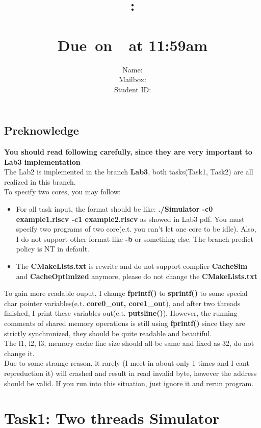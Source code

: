 \mathbb{R} \documentclass{article}
\title{
    \vspace{2in}
    \textmd{\textbf{\hmwkClass:\\  \hmwkTitle}}\\
    \normalsize\vspace{0.1in}\small{Due\ on\ \hmwkDueDate\ at 11:59am}\\
   \vspace{2in}
}
\author{
	Name: \textbf{\hmwkAuthorName} \\
    Mailbox: \textbf{\hmwkAuthorMail} \\
	Student ID: \hmwkAuthorID}
\date{}
\begin{document}
\maketitle
\pagebreak
\tableofcontents

\pagebreak


\subsection{Preknowledge}
\textcolor[rgb]{1,0,0}{\textbf{You should read following carefully, since they are very important to Lab3 implementation}}\\
The Lab2 is implemented in the branch \textbf{Lab3}, both tasks(Task1, Task2) are all realized in this branch.\\
To specify two cores, you may follow:
\begin{itemize}
  \item For all task input, the format should be like: \textbf{./Simulator -c0 example1.riscv -c1 example2.riscv} as showed in Lab3 pdf. You must specify two programs of two core(e.t. you can't let one core to be idle). Also, I do not support other format like \textbf{-b} or something else. The branch predict policy is NT in default. 
  \item The \textbf{CMakeLists.txt} is rewrite and do not support complier \textbf{CacheSim} and \textbf{CacheOptimized} anymore, please do not change the \textbf{CMakeLists.txt}
\end{itemize} 
To gain more readable ouput, I change \textbf{fprintf()} to \textbf{sprintf()} to some special char pointer variables(e.t. \textbf{core0\_out, core1\_out}), and after two threads finished, I print these variables out(e.t. \textbf{putsline()}). However, the running comments of shared memory operations is still using \textbf{fprintf()} since they are strictly synchronized, they should be quite readable and beautiful.\\
The l1, l2, l3, memory cache line size should all be same and fixed as 32, do not change it.\\
Due to some strange reason, it rarely (I meet in about only 1 times and I cant repreduction it) will crashed and result in read invalid byte, however the address should be valid. If you run into this situation, just ignore it and rerun program.

\section{Task1: Two threads Simulator}
\end{document}
